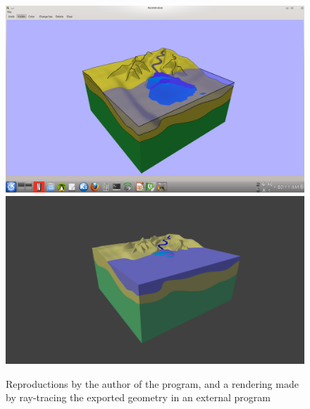 \documentclass[a4paper,12pt]{report}
\begin{document}
\begin{figure}
\includegraphics[trim = 90mm 22mm 80mm 30mm, clip,width=.5\linewidth]{thesis/resultsSection/sketch/author.png}
\includegraphics[trim = 40mm 0mm 30mm 9mm, clip,width=.5\linewidth]{thesis/resultsSection/sketch/authorBlend.png}
 \caption{Reproductions by the author of the program, and a rendering made by ray-tracing the exported geometry in an external program}
 \label{fig:sketchRepro2}
\end{figure}
\end{document}
